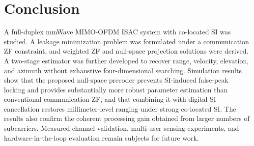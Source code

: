 \documentclass[conference]{IEEEtran}
\begin{document}
\section{Conclusion}\label{sec:conclusion}
A full-duplex mmWave MIMO-OFDM ISAC system with co-located SI was studied. A leakage minimization problem was formulated under a communication ZF constraint, and weighted ZF and null-space projection solutions were derived. A two-stage estimator was further developed to recover range, velocity, elevation, and azimuth without exhaustive four-dimensional searching. Simulation results show that the proposed null-space precoder prevents SI-induced false-peak locking and provides substantially more robust parameter estimation than conventional communication ZF, and that combining it with digital SI cancellation restores millimeter-level ranging under strong co-located SI. The results also confirm the coherent processing gain obtained from larger numbers of subcarriers. Measured-channel validation, multi-user sensing experiments, and hardware-in-the-loop evaluation remain subjects for future work.
\end{document}
